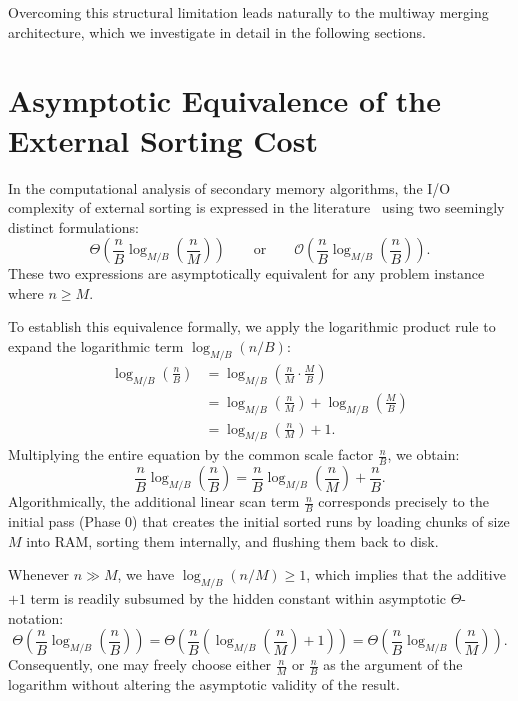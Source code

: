 Overcoming this structural limitation leads naturally to the multiway merging architecture, which we investigate in detail in the following sections.

\section{Asymptotic Equivalence of the External Sorting Cost}
\label{sec:sorting-cost-equivalence}

In the computational analysis of secondary memory algorithms, the I/O complexity of external sorting is expressed in the literature~\cite{aggarwal1988} using two seemingly distinct formulations:
\begin{equation}
  \Theta\left(\frac{n}{B} \log_{M/B}\left(\frac{n}{M}\right)\right)
  \qquad \text{or} \qquad
  \mathcal{O}\left(\frac{n}{B} \log_{M/B}\left(\frac{n}{B}\right)\right).
\end{equation}
These two expressions are asymptotically equivalent for any problem instance where $n \ge M$.

To establish this equivalence formally, we apply the logarithmic product rule to expand the logarithmic term $\log_{M/B}(n/B)$:
\begin{align}
  \log_{M/B}\left(\frac{n}{B}\right)
  &= \log_{M/B}\left(\frac{n}{M} \cdot \frac{M}{B}\right) \nonumber \\
  &= \log_{M/B}\left(\frac{n}{M}\right) + \log_{M/B}\left(\frac{M}{B}\right) \nonumber \\
  &= \log_{M/B}\left(\frac{n}{M}\right) + 1.
  \label{eq:log-equivalence}
\end{align}
Multiplying the entire equation by the common scale factor $\frac{n}{B}$, we obtain:
\begin{equation}
  \frac{n}{B} \log_{M/B}\left(\frac{n}{B}\right)
  = \frac{n}{B} \log_{M/B}\left(\frac{n}{M}\right) + \frac{n}{B}.
\end{equation}
Algorithmically, the additional linear scan term $\frac{n}{B}$ corresponds precisely to the initial pass (Phase 0) that creates the initial sorted runs by loading chunks of size $M$ into RAM, sorting them internally, and flushing them back to disk.

Whenever $n \gg M$, we have $\log_{M/B}(n/M) \ge 1$, which implies that the additive $+1$ term is readily subsumed by the hidden constant within asymptotic $\Theta$-notation:
\begin{equation}
  \Theta\left(\frac{n}{B} \log_{M/B}\left(\frac{n}{B}\right)\right)
  = \Theta\left(\frac{n}{B} \left(\log_{M/B}\left(\frac{n}{M}\right) + 1\right)\right)
  = \Theta\left(\frac{n}{B} \log_{M/B}\left(\frac{n}{M}\right)\right).
\end{equation}
Consequently, one may freely choose either $\frac{n}{M}$ or $\frac{n}{B}$ as the argument of the logarithm without altering the asymptotic validity of the result.

